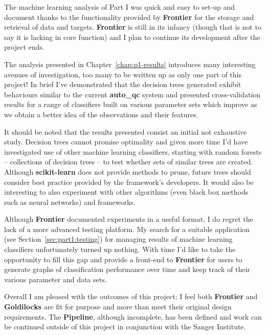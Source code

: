 The machine learning analysis of Part I was quick and easy to set-up and
document thanks to the functionality provided by \textbf{Frontier} for the
storage and retrieval of data and targets. \textbf{Frontier} is still in its
infancy (though that is not to say it is lacking in core function) and I plan to
continue its development after the project ends.

The analysis presented in Chapter~\ref{chap:p1-results} introduces many
interesting avenues of investigation, too many to be written up as only one part
of this project! In brief I've demonstrated that the decision trees generated
exhibit behaviours similar to the current \textbf{auto\_qc} system and presented
cross-validation results for a range of classifiers built on various parameter
sets which improve as we obtain a better idea of the observations and their
features.

It should be noted that the results presented consist an initial not
exhaustive study. Decision trees cannot promise optimality and given more time
I'd have investigated use of other machine learning classifiers,
starting with random forests -- collections of decision trees -- to test whether
sets of similar trees are created. Although \textbf{scikit-learn} does not
provide methods to prune, future trees should consider best practice provided by
the framework's developers\citep{sl:tips}.
It would also be interesting to also experiment with other algorithms (even black
box methods such as neural networks) and frameworks.

Although \textbf{Frontier} documented experiments in a useful format, I do
regret the lack of a more advanced testing platform. My search for
a suitable application (see Section~\ref{sec:part1:testing}) for managing
results of machine learning classifiers unfortunately turned up nothing. With
time I'd like to take the opportunity to fill this gap and provide a front-end
to \textbf{Frontier} for users to generate graphs of classification performance
over time and keep track of their various parameter and data sets.

Overall I am pleased with the outcomes of this project; I feel both
\textbf{Frontier} and \textbf{Goldilocks} are fit for purpose and more than meet
their original design requirements. The \textbf{Pipeline}, although incomplete,
has been defined and work can be continued outside of this project in
conjunction with the Sanger Institute.


